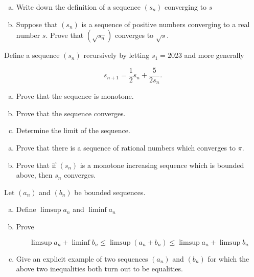 \documentclass[11pt]{exam}
\theoremstyle{definition}
\begin{document}
\begin{questions}
\newpage
\question[10]\mbox{}

\begin{enumerate}[(a)]
\item  Write down the definition of a sequence $(s_n)$ converging to $s$
\vspace{2in}
\item  Suppose that $(s_n)$ is a sequence of positive numbers converging to a real number $s$.
Prove that $(\sqrt{s_n})$ converges to $\sqrt{s}$.
\end{enumerate}

\newpage
\question[10]\mbox{}

Define a sequence $(s_n)$ recursively by letting $s_1 = 2023$ and more generally

$$s_{n+1} = \frac{1}{2}s_n +\frac{5}{2s_n}.$$

\begin{enumerate}[(a)]
\item Prove that the sequence is monotone.
\vspace{3in}
\item Prove that the sequence converges.
\vspace{2in}
\item Determine the limit of the sequence.
\end{enumerate}

\newpage
\question[10]\mbox{}
\begin{enumerate}[(a)]
\item
Prove that there is a sequence of rational numbers which converges to $\pi$.
\vspace{4in}
\item
Prove that if $(s_n)$ is a monotone increasing sequence which is bounded above, then $s_n$ converges.
\end{enumerate}

\newpage
\question[10]\mbox{}
Let $(a_n)$ and $(b_n)$ be bounded sequences.
\begin{enumerate}[(a)]
\item Define $\limsup a_n$ and $\liminf a_n$
\vspace{2in}
\item Prove

$$\limsup a_n + \liminf b_n \leq\limsup (a_n+b_n)\leq \limsup a_n + \limsup b_n$$
\vspace{4in}

\item

Give an explicit example of two sequences $(a_n)$ and $(b_n)$ for which the above two inequalities both turn out to be equalities.
\end{enumerate}

\end{questions}
\end{document}
